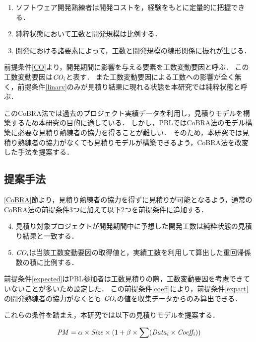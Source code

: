 \documentclass{compsoft}
\begin{document}
\begin{enumerate}
\setcounter{enumi}{0}
	\item ソフトウェア開発熟練者は開発コストを，経験をもとに定量的に把握できる．\label{expart}
	\item 純粋状態において工数と開発規模は比例する．\label{linary}
	\item 開発における諸要素によって，工数と開発規模の線形関係に振れが生じる．\label{CO}
\end{enumerate}	

前提条件\ref{CO}より，開発期間に影響を与える要素を工数変動要因と呼ぶ．
この工数変動要因は$ {\it CO_{i} } $と表す．
また工数変動要因による工数への影響が全く無く，前提条件\ref{linary}のみが見積り結果に現れる状態を本研究では純粋状態と呼ぶ．

このCoBRA法では過去のプロジェクト実績データを利用し，見積りモデルを構築するため本研究の目的に適している．
しかし，PBLではCoBRA法のモデル構築に必要な見積り熟練者の協力を得ることが難しい．
そのため，本研究では見積り熟練者の協力がなくても見積りモデルが構築できるよう，CoBRA法を改変した手法を提案する．

\subsection{提案手法} \label{proposed}

\ref{CoBRA}節より，見積り熟練者の協力を得ずに見積りが可能となるよう，通常のCoBRA法の前提条件3つに加えて以下2つを前提条件に追加する．

\begin{enumerate}
\setcounter{enumi}{3}
	\item 見積り対象プロジェクトが開発期間中に予想した開発工数は純粋状態の見積り結果と一致する．\label{expected}
	\item $ {\it CO_{i} } $は当該工数変動要因の取得値と，実績工数を利用して算出した重回帰係数の積に比例する．\label{coeff}
\end{enumerate}

前提条件\ref{expected}はPBL参加者は工数見積りの際，工数変動要因を考慮できていないことが多いため設定した．
この前提条件\ref{coeff}により，前提条件\ref{expart}の開発熟練者の協力がなくとも ${\it CO_{i} } $の値を収集データからのみ算出できる．

これらの条件を踏まえ，本研究では以下の見積りモデルを提案する．

\begin{equation}
{\it PM = \alpha \times Size} \times ( 1 + \beta \times \sum ({\it Data_{i}} \times {\it Coeff_{i} }) ) \label{proposed-model}
\end{equation}
\end{document}
